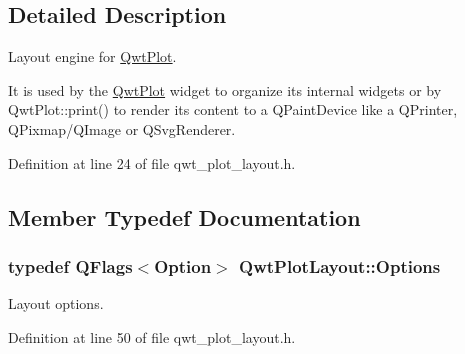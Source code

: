 \subsection{Detailed Description}
Layout engine for \hyperlink{class_qwt_plot}{Qwt\-Plot}. 

It is used by the \hyperlink{class_qwt_plot}{Qwt\-Plot} widget to organize its internal widgets or by Qwt\-Plot\-::print() to render its content to a Q\-Paint\-Device like a Q\-Printer, Q\-Pixmap/\-Q\-Image or Q\-Svg\-Renderer. 

Definition at line 24 of file qwt\-\_\-plot\-\_\-layout.\-h.



\subsection{Member Typedef Documentation}
\hypertarget{class_qwt_plot_layout_aa43457184903f3aaa58e6e073622ef52}{
\subsubsection[{Options}]{\setlength{\rightskip}{0pt plus 5cm}typedef Q\-Flags$<${\bf Option}$>$ {\bf Qwt\-Plot\-Layout\-::\-Options}}}\label{class_qwt_plot_layout_aa43457184903f3aaa58e6e073622ef52}


Layout options. 



Definition at line 50 of file qwt\-\_\-plot\-\_\-layout.\-h.



